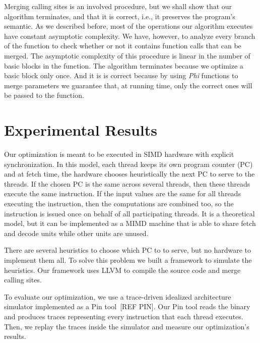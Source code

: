 \documentclass[times,10pt,twocolumn]{article}
\begin{document}
Merging calling sites is an involved procedure, but we shall show that our 
algorithm terminates, and that it is correct, i.e., it preserves the  program's
semantic.
As we described before, most of the operations our algorithm executes have 
constant asymptotic complexity. 
We have, however, to analyze every branch of the function to check whether or
not it contains function calls that can be merged. The asymptotic complexity
of this procedure is linear in the number of basic blocks in the function. 
The algorithm terminates because we optimize a basic block only once. 
And it is is correct because by using \textit{Phi} functions to merge 
parameters we guarantee that, at running time, only the correct ones will be
passed to the function.

\section{Experimental Results}
\label{sec:exp}

Our optimization is meant to be executed in SIMD hardware with explicit
synchronization.
In this model, each thread keeps its own program counter (PC) and at fetch 
time, the hardware chooses heuristically the next PC to serve to the threads.
If the chosen PC is the same across several threads, then these threads execute
the same instruction.
If the input values are the same for all threads executing the instruction,
then the computations are combined too, so the instruction is issued once
on behalf of all participating threads.
It is a theoretical model, but it can be implemented as a MIMD machine that is
able to share fetch and decode units while other units are unused.

There are several heuristics to choose which PC to to serve, but no hardware to 
implement them all.
To solve this problem we built a framework to simulate the heuristics.
Our framework uses LLVM to compile the source code and merge calling sites.

To evaluate our optimization, we use a trace-driven idealized architecture simulator
implemented as a Pin tool~[REF PIN].
Our Pin tool reads the binary and produces traces representing every 
instruction that each thread executes. 
Then, we replay the traces inside the simulator and measure our 
optimization's results.
\end{document}

